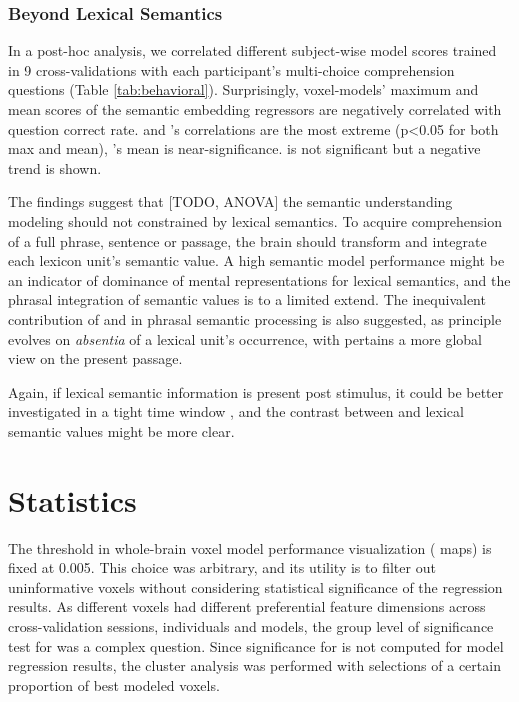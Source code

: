 \subsubsection{Beyond Lexical Semantics}

In a post-hoc analysis, we correlated different subject-wise model scores trained in 9 cross-validations with each participant's multi-choice comprehension questions (Table \ref{tab:behavioral}). Surprisingly, voxel-models' maximum and mean scores of the semantic embedding regressors are negatively correlated with question correct rate.  and 's correlations are the most extreme (p<0.05 for both max and mean), 's mean is near-significance.  is not significant but a negative trend is shown. 

The findings suggest that [TODO, ANOVA] the semantic understanding modeling should not constrained by lexical semantics. To acquire comprehension of a full phrase, sentence or passage, the brain should transform and integrate each lexicon unit's semantic value. A high semantic model performance might be an indicator of dominance of mental representations for lexical semantics, and the phrasal integration of semantic values is to a limited extend. The inequivalent contribution of \similarity and \association in phrasal semantic processing is also suggested, as \similarity principle evolves on \emph{absentia} of a lexical unit's occurrence, with \association pertains a more global view on the present passage.

Again, if lexical semantic information is present post stimulus, it could be better investigated in a tight time window , and the contrast between \similarity and \association lexical semantic values might be more clear.

\section{Statistics}

The threshold in whole-brain voxel model performance visualization ( maps) is fixed at 0.005. This choice was arbitrary, and its utility is to filter out uninformative voxels without considering statistical significance of the regression results. As different voxels had different preferential feature dimensions across cross-validation sessions, individuals and models, the group level of significance test for  was a complex question. Since significance for  is not computed for model regression results, the cluster analysis was performed with selections of a certain proportion of best modeled voxels.


